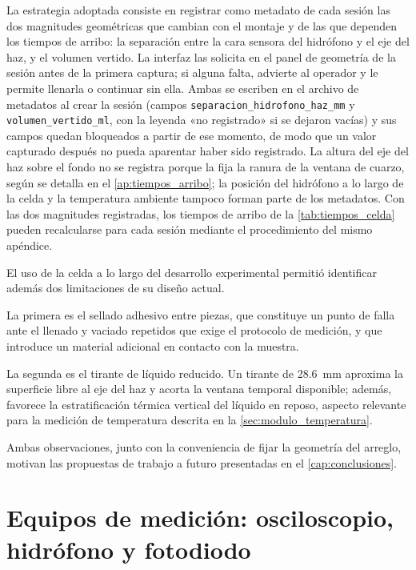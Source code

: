 La estrategia adoptada consiste en registrar como metadato de cada
sesión las dos magnitudes geométricas que cambian con el montaje y de
las que dependen los tiempos de arribo: la separación entre la cara
sensora del hidrófono y el eje del haz, y el volumen vertido. La
interfaz las solicita en el panel de geometría de la sesión antes de
la primera captura; si alguna falta, advierte al operador y le permite
llenarla o continuar sin ella. Ambas se escriben en el archivo de
metadatos al crear la sesión (campos
\texttt{separacion\_hidrofono\_haz\_mm} y
\texttt{volumen\_vertido\_ml}, con la leyenda «no registrado» si se
dejaron vacías) y sus campos quedan bloqueados a partir de ese
momento, de modo que un valor capturado después no pueda aparentar
haber sido registrado. La altura del eje del haz sobre el fondo no se
registra porque la fija la ranura de la ventana de cuarzo, según se
detalla en el \cref{ap:tiempos_arribo}; la posición del hidrófono a lo
largo de la celda y la temperatura ambiente tampoco forman parte de
los metadatos. Con las dos magnitudes registradas, los tiempos de
arribo de la \cref{tab:tiempos_celda} pueden recalcularse para cada
sesión mediante el procedimiento del mismo apéndice.

El uso de la celda a lo largo del desarrollo experimental permitió
identificar además dos limitaciones de su diseño actual.

La primera es el sellado adhesivo entre piezas, que constituye un
punto de falla ante el llenado y vaciado repetidos que exige el
protocolo de medición, y que introduce un material adicional en
contacto con la muestra.

La segunda es el tirante de líquido reducido. Un tirante de
\SI{28.6}{\milli\meter} aproxima la superficie libre al eje del haz y
acorta la ventana temporal disponible; además, favorece la
estratificación térmica vertical del líquido en reposo, aspecto
relevante para la medición de temperatura descrita en la
\cref{sec:modulo_temperatura}.

Ambas observaciones, junto con la conveniencia de fijar la geometría
del arreglo, motivan las propuestas de trabajo a futuro presentadas
en el \cref{cap:conclusiones}.

\section{Equipos de medición: osciloscopio, hidrófono y fotodiodo}
\label{sec:equipos}

